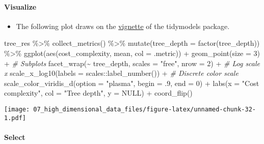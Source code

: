 \documentclass[
]{book}
\newenvironment{Shaded}{\begin{snugshade}}{\end{snugshade}}
\newcommand{\AttributeTok}[1]{\textcolor[rgb]{0.77,0.63,0.00}{#1}}
\newcommand{\CommentTok}[1]{\textcolor[rgb]{0.56,0.35,0.01}{\textit{#1}}}
\newcommand{\ConstantTok}[1]{\textcolor[rgb]{0.00,0.00,0.00}{#1}}
\newcommand{\DecValTok}[1]{\textcolor[rgb]{0.00,0.00,0.81}{#1}}
\newcommand{\FunctionTok}[1]{\textcolor[rgb]{0.00,0.00,0.00}{#1}}
\newcommand{\NormalTok}[1]{#1}
\newcommand{\SpecialCharTok}[1]{\textcolor[rgb]{0.00,0.00,0.00}{#1}}
\newcommand{\StringTok}[1]{\textcolor[rgb]{0.31,0.60,0.02}{#1}}
\providecommand{\tightlist}{%
  \setlength{\itemsep}{0pt}\setlength{\parskip}{0pt}}
\begin{document}
\hypertarget{visualize-1}{%
\paragraph{Visualize}\label{visualize-1}}

\begin{itemize}
\tightlist
\item
  The following plot draws on the \href{https://www.tidymodels.org/start/tuning/}{vignette} of the tidymodels package.
\end{itemize}

\begin{Shaded}
\begin{Highlighting}[]
\NormalTok{tree\_res }\SpecialCharTok{\%\textgreater{}\%}
  \FunctionTok{collect\_metrics}\NormalTok{() }\SpecialCharTok{\%\textgreater{}\%}
  \FunctionTok{mutate}\NormalTok{(}\AttributeTok{tree\_depth =} \FunctionTok{factor}\NormalTok{(tree\_depth)) }\SpecialCharTok{\%\textgreater{}\%}
  \FunctionTok{ggplot}\NormalTok{(}\FunctionTok{aes}\NormalTok{(cost\_complexity, mean, }\AttributeTok{col =}\NormalTok{ .metric)) }\SpecialCharTok{+}
  \FunctionTok{geom\_point}\NormalTok{(}\AttributeTok{size =} \DecValTok{3}\NormalTok{) }\SpecialCharTok{+}
  \CommentTok{\# Subplots }
  \FunctionTok{facet\_wrap}\NormalTok{(}\SpecialCharTok{\textasciitilde{}}\NormalTok{ tree\_depth, }
             \AttributeTok{scales =} \StringTok{"free"}\NormalTok{, }
             \AttributeTok{nrow =} \DecValTok{2}\NormalTok{) }\SpecialCharTok{+}
  \CommentTok{\# Log scale x }
  \FunctionTok{scale\_x\_log10}\NormalTok{(}\AttributeTok{labels =}\NormalTok{ scales}\SpecialCharTok{::}\FunctionTok{label\_number}\NormalTok{()) }\SpecialCharTok{+}
  \CommentTok{\# Discrete color scale }
  \FunctionTok{scale\_color\_viridis\_d}\NormalTok{(}\AttributeTok{option =} \StringTok{"plasma"}\NormalTok{, }\AttributeTok{begin =}\NormalTok{ .}\DecValTok{9}\NormalTok{, }\AttributeTok{end =} \DecValTok{0}\NormalTok{) }\SpecialCharTok{+}
  \FunctionTok{labs}\NormalTok{(}\AttributeTok{x =} \StringTok{"Cost complexity"}\NormalTok{,}
       \AttributeTok{col =} \StringTok{"Tree depth"}\NormalTok{,}
       \AttributeTok{y =} \ConstantTok{NULL}\NormalTok{) }\SpecialCharTok{+}
  \FunctionTok{coord\_flip}\NormalTok{()}
\end{Highlighting}
\end{Shaded}

\texttt{[image: 07\_high\_dimensional\_data\_files/figure-latex/unnamed-chunk-32-1.pdf]}

\hypertarget{select-1}{%
\paragraph{Select}\label{select-1}}
\end{document}
